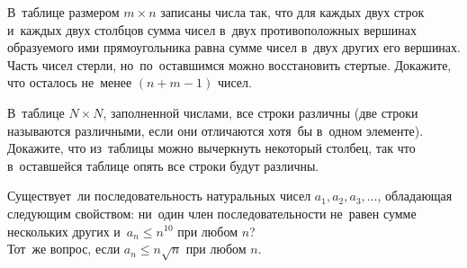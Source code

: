 \begin{problems}
\item
В~таблице размером $m \times n$ записаны числа так, что для каждых двух строк
и~каждых двух столбцов сумма чисел в~двух противоположных вершинах образуемого
ими прямоугольника равна сумме чисел в~двух других его вершинах.
Часть чисел стерли, но~по~оставшимся можно восстановить стертые.
Докажите, что осталось не~менее $(n + m - 1)$ чисел.

\item
В~таблице $N \times N$, заполненной числами, все строки различны (две строки
называются различными, если они отличаются хотя~бы в~одном элементе).
Докажите, что из~таблицы можно вычеркнуть некоторый столбец, так что
в~оставшейся таблице опять все строки будут различны.

\item
\sp
Существует~ли последовательность натуральных чисел $a_1, a_2, a_3, \ldots$,
обладающая следующим свойством: ни~один член последовательности не~равен сумме
нескольких других и~$a_n \leq n^{10}$ при любом $n$?
\\
\sp
Тот~же вопрос, если $a_n \leq n \sqrt{n}$ при любом $n$.

\end{problems}


